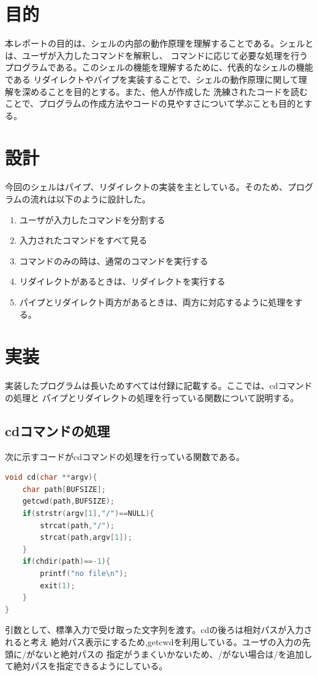 \documentclass[a4j, twocolumn]{ltjsarticle}
\begin{document}
  \section{目的}
  本レポートの目的は、シェルの内部の動作原理を理解することである。シェルとは、ユーザが入力したコマンドを解釈し、
  コマンドに応じて必要な処理を行うプログラムである。このシェルの機能を理解するために、代表的なシェルの機能である
  リダイレクトやパイプを実装することで、シェルの動作原理に関して理解を深めることを目的とする。また、他人が作成した
  洗練されたコードを読むことで、プログラムの作成方法やコードの見やすさについて学ぶことも目的とする。

  \section{設計}
    今回のシェルはパイプ、リダイレクトの実装を主としている。そのため、プログラムの流れは以下のように設計した。
    \begin{enumerate}
      \item ユーザが入力したコマンドを分割する
      \item 入力されたコマンドをすべて見る
      \item コマンドのみの時は、通常のコマンドを実行する
      \item リダイレクトがあるときは、リダイレクトを実行する
      \item パイプとリダイレクト両方があるときは、両方に対応するように処理をする。
    \end{enumerate}
  
  \section{実装}
    実装したプログラムは長いためすべては付録に記載する。ここでは、cdコマンドの処理と
    パイプとリダイレクトの処理を行っている関数について説明する。
    \subsection{cdコマンドの処理}
      次に示すコードがcdコマンドの処理を行っている関数である。
      \begin{lstlisting}[language=C,caption=cdコマンドの処理]
void cd(char **argv){
	char path[BUFSIZE];
	getcwd(path,BUFSIZE);
	if(strstr(argv[1],"/")==NULL){
		strcat(path,"/");
		strcat(path,argv[1]);
	}
	if(chdir(path)==-1){
		printf("no file\n");
		exit(1);
	}
}
      \end{lstlisting}
      引数として、標準入力で受け取った文字列を渡す。cdの後ろは相対パスが入力されると考え
      絶対パス表示にするため,getcwdを利用している。ユーザの入力の先頭に/がないと絶対パスの
      指定がうまくいかないため、/がない場合は/を追加して絶対パスを指定できるようにしている。
\end{document}
